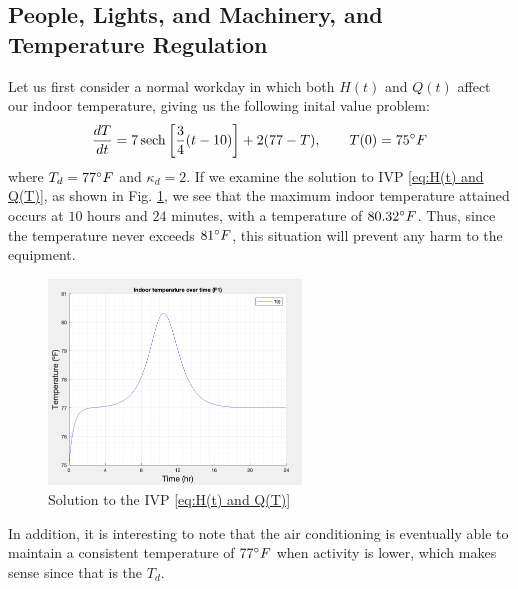 \documentclass[titlepage]{article}
\begin{document}
\subsection{People, Lights, and Machinery, and Temperature Regulation}
Let us first consider a normal workday in which both $H(t)$ and $Q(t)$ affect our indoor temperature, 
giving us the following inital value problem:
\begin{equation}\label{eq:H(t) and Q(T)}
    \frac{dT}{dt} = 7\operatorname{sech}\left[\frac{3}{4}(t-10)\right] + 2(77-T), \qquad T(0)=75\degree F
\end{equation}
where $T_d=77\degree F$ and $\kappa_d=2$. If we examine the solution to IVP \ref{eq:H(t) and Q(T)}, 
as shown in Fig. \ref{fig:H(t) and Q(t)}, we see that the maximum indoor temperature attained occurs at 
$10$ hours and $24$ minutes, with a temperature of $80.32\degree F$. Thus, since the temperature never exceeds
$81\degree F$, this situation will prevent any harm to the equipment.
\begin{figure}[H]
    \centering
    \includegraphics[width=0.6\textwidth]{./images/light_and_furnace.png}
    \caption{Solution to the IVP \eqref{eq:H(t) and Q(T)}}
    \label{fig:H(t) and Q(t)}
\end{figure}
\noindent
In addition, it is interesting to note that the air conditioning is eventually able to maintain
a consistent temperature of $77\degree F$ when activity is lower, which makes sense since that
is the $T_d$.



\end{document}
